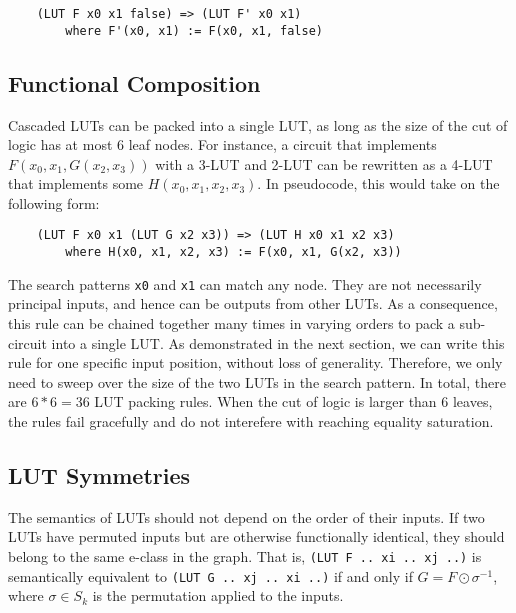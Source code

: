 \begin{verbatim}
    (LUT F x0 x1 false) => (LUT F' x0 x1)
        where F'(x0, x1) := F(x0, x1, false)
\end{verbatim}

\subsection{Functional Composition}\label{sec:rewrites:composition}

Cascaded LUTs can be packed into a single LUT, as long as the size of the cut
of logic has at most 6 leaf nodes. For instance, a circuit that implements
$F(x_0, x_1, G(x_2, x_3))$ with a 3-LUT and 2-LUT can be rewritten as a 4-LUT
that implements some $H(x_0, x_1, x_2, x_3)$. In pseudocode, this would take on
the following form:
\begin{verbatim}
    (LUT F x0 x1 (LUT G x2 x3)) => (LUT H x0 x1 x2 x3)
        where H(x0, x1, x2, x3) := F(x0, x1, G(x2, x3))
\end{verbatim}

The search patterns \texttt{x0} and \texttt{x1} can match any node. They are
not necessarily principal inputs, and hence can be outputs from other LUTs. As
a consequence, this rule can be chained together many times in varying orders
to pack a sub-circuit into a single LUT. As demonstrated in the next section,
we can write this rule for one specific input position, without loss of
generality. Therefore, we only need to sweep over the size of the two LUTs in
the search pattern. In total, there are $6*6 = 36$ LUT packing rules. When the
cut of logic is larger than 6 leaves, the rules fail gracefully and do not
interefere with reaching equality saturation.
\subsection{LUT Symmetries}\label{sec:rewrites:symmetry}

The semantics of LUTs should not depend on the order of their inputs. If two
LUTs have permuted inputs but are otherwise functionally identical, they should
belong to the same e-class in the graph. That is, \mbox{\texttt{(LUT F .. xi ..
        xj ..)}} is semantically equivalent to \mbox{\texttt{(LUT G .. xj .. xi ..)}}
if and only if $G = F \odot \sigma^{-1}$, where $\sigma \in S_k$ is the
permutation applied to the inputs.

